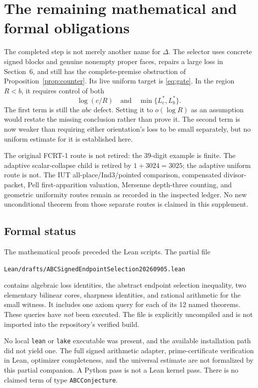 \documentclass[11pt]{article}
\theoremstyle{definition}\newtheorem{definition}[theorem]{Definition}
\theoremstyle{remark}\newtheorem{remark}[theorem]{Remark}
\begin{document}
\section{The remaining mathematical and formal obligations}
The completed step is not merely another name for \(\Delta\). The selector uses concrete signed blocks and genuine nonempty proper faces, repairs a large loss in Section~6, and still has the complete-premise obstruction of Proposition~\ref{prop:counter}. Its live uniform target is \eqref{eq:gate}. In the region \(R<b\), it requires control of both
\[
 \log(c/R)\quad\text{and}\quad \min\{L_c^*,L_b^*\}.
\]
The first term is still the \(abc\) defect. Setting it to \(o(\log R)\) as an assumption would restate the missing conclusion rather than prove it. The second term is now weaker than requiring either orientation's loss to be small separately, but no uniform estimate for it is established here.

The original FCRT-1 route is not retired: the 39-digit example is finite. The adaptive scalar-collapse child is retired by \(1+3024=3025\); the adaptive uniform route is not. The IUT all-place/Ind3/pointed comparison, compensated divisor-packet, Pell first-apparition valuation, Mersenne depth-three counting, and geometric uniformity routes remain as recorded in the inspected ledger. No new unconditional theorem from those separate routes is claimed in this supplement.

\subsection{Formal status}
The mathematical proofs preceded the Lean scripts. The partial file
\begin{center}\small\texttt{Lean/drafts/ABCSignedEndpointSelection20260905.lean}\end{center}
contains algebraic loss identities, the abstract endpoint selection inequality, two elementary bilinear cores, sharpness identities, and rational arithmetic for the small witness. It includes one axiom query for each of its 12 named theorems. These queries have \emph{not} been executed. The file is explicitly uncompiled and is not imported into the repository's verified build.

No local \texttt{lean} or \texttt{lake} executable was present, and the available installation path did not yield one. The full signed arithmetic adapter, prime-certificate verification in Lean, optimizer completeness, and the universal estimate are not formalized by this partial companion. A Python pass is not a Lean kernel pass. There is no claimed term of type \texttt{ABCConjecture}.
\end{document}
